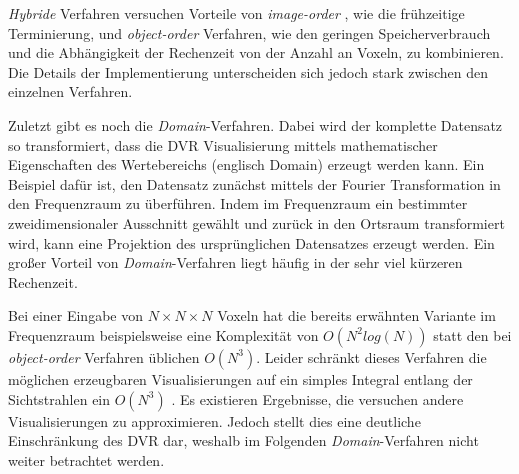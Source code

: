 \documentclass[a4paper,fontsize=12pt,toc=bib,parskip=half,ngerman]{scrartcl}
\begin{document}
\textit{Hybride} Verfahren versuchen Vorteile von  \textit{image-order} , wie die fr\"uhzeitige Terminierung, und \textit{object-order} Verfahren, wie den geringen Speicherverbrauch und die Abh\"angigkeit der Rechenzeit von der Anzahl an Voxeln, zu kombinieren. Die Details der Implementierung unterscheiden sich jedoch stark zwischen den einzelnen Verfahren. 

Zuletzt gibt es noch die \textit{Domain}-Verfahren. Dabei wird der komplette Datensatz so transformiert, dass die DVR Visualisierung mittels mathematischer Eigenschaften des Wertebereichs (englisch \glq Domain\grq{}) erzeugt werden kann. Ein Beispiel daf\"ur ist, den Datensatz zun\"achst mittels der Fourier Transformation in den Frequenzraum zu \"uberf\"uhren. Indem im Frequenzraum ein bestimmter zweidimensionaler Ausschnitt gew\"ahlt und zur\"uck in den Ortsraum transformiert wird, kann eine Projektion des urspr\"unglichen Datensatzes erzeugt werden. Ein gro{\ss}er Vorteil von \textit{Domain}-Verfahren liegt h\"aufig in der sehr viel k\"urzeren Rechenzeit.

Bei einer Eingabe von $N\times N\times N$ Voxeln hat die bereits erw\"ahnten Variante im Frequenzraum beispielsweise eine Komplexit\"at von $O(N^2 log(N))$ statt den bei \textit{object-order} Verfahren \"ublichen $O(N^3)$. Leider schr\"ankt dieses Verfahren die m\"oglichen erzeugbaren Visualisierungen auf ein simples Integral entlang der Sichtstrahlen ein $O(N^3)$ \cite[S.~143]{hansen2005visualization}. Es existieren Ergebnisse, die versuchen andere Visualisierungen zu approximieren. Jedoch stellt dies eine deutliche Einschr\"ankung des DVR dar, weshalb im Folgenden \textit{Domain}-Verfahren nicht weiter betrachtet werden.
\end{document}

